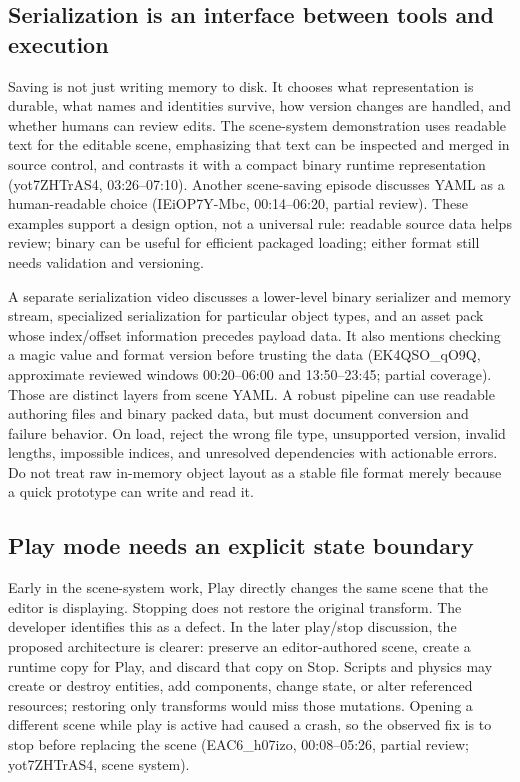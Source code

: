 \subsection{Serialization is an interface between tools and execution}\label{06-engine-ii-ch033-serialization-is-an-interface-between-tools-and-execution}

\hypertarget{06-engine-ii-ch033-serialization-is-an-interface-between-tools-and-execution}{}

Saving is not just writing memory to disk. It chooses what representation is durable, what names and identities survive, how version changes are handled, and whether humans can review edits. The scene-system demonstration uses readable text for the editable scene, emphasizing that text can be inspected and merged in source control, and contrasts it with a compact binary runtime representation (yot7ZHTrAS4, 03:26--07:10). Another scene-saving episode discusses YAML as a human-readable choice (IEiOP7Y-Mbc, 00:14--06:20, partial review). These examples support a design option, not a universal rule: readable source data helps review; binary can be useful for efficient packaged loading; either format still needs validation and versioning.

A separate serialization video discusses a lower-level binary serializer and memory stream, specialized serialization for particular object types, and an asset pack whose index/offset information precedes payload data. It also mentions checking a magic value and format version before trusting the data (EK4QSO\_qO9Q, approximate reviewed windows 00:20--06:00 and 13:50--23:45; partial coverage). Those are distinct layers from scene YAML. A robust pipeline can use readable authoring files and binary packed data, but must document conversion and failure behavior. On load, reject the wrong file type, unsupported version, invalid lengths, impossible indices, and unresolved dependencies with actionable errors. Do not treat raw in-memory object layout as a stable file format merely because a quick prototype can write and read it.

\subsection{Play mode needs an explicit state boundary}\label{06-engine-ii-ch033-play-mode-needs-an-explicit-state-boundary}

\hypertarget{06-engine-ii-ch033-play-mode-needs-an-explicit-state-boundary}{}

Early in the scene-system work, Play directly changes the same scene that the editor is displaying. Stopping does not restore the original transform. The developer identifies this as a defect. In the later play/stop discussion, the proposed architecture is clearer: preserve an editor-authored scene, create a runtime copy for Play, and discard that copy on Stop. Scripts and physics may create or destroy entities, add components, change state, or alter referenced resources; restoring only transforms would miss those mutations. Opening a different scene while play is active had caused a crash, so the observed fix is to stop before replacing the scene (EAC6\_h07izo, 00:08--05:26, partial review; yot7ZHTrAS4, scene system).

